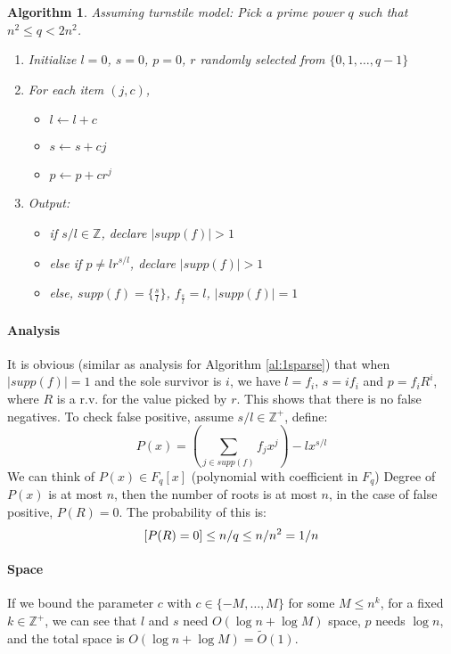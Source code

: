 \documentclass[11pt]{article}
\theoremstyle{plain}
\newtheorem{algorithm}{Algorithm}[section]
\let\Pr\relax
\DeclareMathOperator*{\Pr}{\mathbb{P}}
\begin{document}
\begin{algorithm}
	\label{al:1sparsedetection-advanced}
	Assuming turnstile model: Pick a prime power $q$ such that $n^2\leq 
	q<2n^2$.
	\begin{enumerate}
		\item Initialize $l=0$, $s=0$, $p=0$, $r$ randomly selected from 
		$\{0,1,\dots,q-1\}$
		\item For each item $(j,c)$,
		\begin{itemize}
			\item $l\leftarrow l +c$
			\item $s\leftarrow s+cj$
				\item $p\leftarrow p+cr^j$
		\end{itemize}
		\item Output:\begin{itemize}
			\item if $s/l\in \mathbb{Z}$, declare  $|supp(f)|>1$
			\item else if $p\neq lr^{s/l}$, declare $|supp(f)|>1$
			\item else, 	$supp(f)=\{\frac{s}{l}\}$, $f_{\frac{s}{l}}=l$, $|supp(f)|=1$
		\end{itemize}
	\end{enumerate}
\end{algorithm}

\paragraph{Analysis}
It is obvious (similar as analysis for Algorithm \ref{al:1sparse}) that when 
$|supp(f)|=1$ and the sole survivor is $i$, we have $l=f_i$, $s=if_i$ and 
$p=f_iR^i$, where $R$ is a r.v. for the value picked by $r$. This shows that 
there is no false negatives. To check false positive, assume $s/l\in 
\mathbb{Z^+}$, define: 
\[
P(x)=(\sum_{j\in supp(f)}f_jx^j)-lx^{s/l}
\]
We can think of $P(x)\in F_q[x]$ (polynomial with coefficient in $F_q$) Degree 
of $P(x)$ is at most $n$, then the number of roots is at most $n$, in the 
case of false positive, $P(R)=0$. The probability of this is: 
\[
\Pr[P(R)=0]\leq n/q \leq n/n^2 =1/n
\]

\paragraph{Space} If we bound the parameter $c$ with $c\in \{-M,\dots,M\}$ 
for some $M\leq n^k$, for a fixed $k\in \mathbb{Z^+}$, we can see that $l$ and 
$s$ need $O(\log n+\log M)$ space, $p$ needs $\log n$, and the total space is 
$O(\log n+\log M)=\tilde{O}(1)$.
\end{document}

